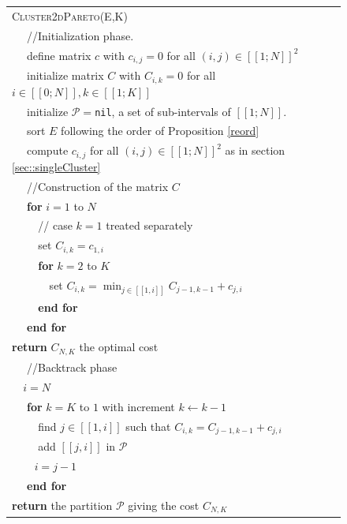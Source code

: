 ﻿\documentclass{meta}
\def\PP{{\mathcal{P}}}
\begin{document}
{\begin{figure}[ht]
\begin{tabular}{ l }
\textsc{Cluster2dPareto}(E,K)\\
\verb!  ! //Initialization phase. \\ %
\verb!  ! define matrix $c$ with $c_{i,j}=0$  for all $(i,j)\in [\![1;N]\!]^2$\\
\verb!  ! initialize  matrix $C$ with  $C_{i,k}=0$  for all $i\in [\![0;N]\!], k\in [\![1;K]\!]$\\
\verb!  ! initialize $\PP=$\verb!nil!, a set of sub-intervals of $[\![1;N]\!]$.\\
\verb!  ! sort $E$ following the order of Proposition \ref{reord}\\
\verb!  ! compute $c_{i,j}$ for all $(i,j)\in [\![1;N]\!]^2$ as in section \ref{sec::singleCluster}\\
\verb!  ! //Construction of the matrix $C$ \\
\verb!  ! \textbf{for} $i=1$ to $N$\\

\verb!    ! // case $k=1$ treated separately\\
\verb!    ! set $C_{i,k} = c_{1,i}$\\
\verb!    ! \textbf{for} $k=2$ to $K$ \\
\verb!      ! set $C_{i,k} = \min_{j \in [\![1,i]\!]} C_{j-1,k-1} + c_{j,i}$\\
\verb!    ! \textbf{end for} \\
\verb!  ! \textbf{end for} \\
\textbf{return} $C_{N,K}$ the optimal cost \\

\verb!  ! //Backtrack phase\\
\verb!  ! $i=N$\\
\verb!  ! \textbf{for} $k=K$ to $1$ with increment $k \leftarrow k-1$\\
\verb!    ! find $j\in [\![1,i]\!]$ such that $C_{i,k} = C_{j-1,k-1} + c_{j,i}$\\
\verb!    ! add $[\![j,i]\!]$ in $\PP$\\
\verb!    ! %
$i=j-1$\\
\verb!  ! \textbf{end for} \\

\textbf{return} the partition $\PP$ giving the cost $C_{N,K}$\\
\hline
\end{tabular}
\end{figure}

}
\end{document}
